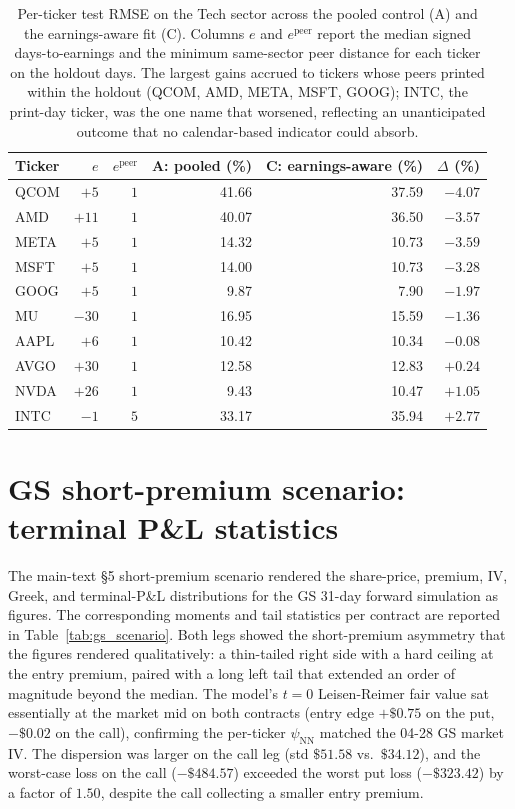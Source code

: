 \begin{table}[ht]
\centering
\caption{Per-ticker test RMSE on the Tech sector across the pooled control (A) and the earnings-aware fit (C). Columns $e$ and $e^{\text{peer}}$ report the median signed days-to-earnings and the minimum same-sector peer distance for each ticker on the holdout days. The largest gains accrued to tickers whose peers printed within the holdout (QCOM, AMD, META, MSFT, GOOG); INTC, the print-day ticker, was the one name that worsened, reflecting an unanticipated outcome that no calendar-based indicator could absorb.}\label{tab:tech_pivot}
\begin{tabular}{lrrrrr}
\toprule
Ticker & $e$ & $e^{\text{peer}}$ & A: pooled (\%) & C: earnings-aware (\%) & $\Delta$ (\%) \\
\midrule
QCOM & $+5$  & $1$ & 41.66 & 37.59 & $-4.07$ \\
AMD  & $+11$ & $1$ & 40.07 & 36.50 & $-3.57$ \\
META & $+5$  & $1$ & 14.32 & 10.73 & $-3.59$ \\
MSFT & $+5$  & $1$ & 14.00 & 10.73 & $-3.28$ \\
GOOG & $+5$  & $1$ &  9.87 &  7.90 & $-1.97$ \\
MU   & $-30$ & $1$ & 16.95 & 15.59 & $-1.36$ \\
AAPL & $+6$  & $1$ & 10.42 & 10.34 & $-0.08$ \\
AVGO & $+30$ & $1$ & 12.58 & 12.83 & $+0.24$ \\
NVDA & $+26$ & $1$ &  9.43 & 10.47 & $+1.05$ \\
INTC & $-1$  & $5$ & 33.17 & 35.94 & $+2.77$ \\
\bottomrule
\end{tabular}
\end{table}

\section{GS short-premium scenario: terminal P\&L statistics}\label{sec:supp_gs_pnl}

The main-text §5 short-premium scenario rendered the share-price, premium, IV, Greek, and terminal-P\&L distributions for the GS 31-day forward simulation as figures. The corresponding moments and tail statistics per contract are reported in Table~\ref{tab:gs_scenario}. Both legs showed the short-premium asymmetry that the figures rendered qualitatively: a thin-tailed right side with a hard ceiling at the entry premium, paired with a long left tail that extended an order of magnitude beyond the median. The model's $t=0$ Leisen-Reimer fair value sat essentially at the market mid on both contracts (entry edge $+\$0.75$ on the put, $-\$0.02$ on the call), confirming the per-ticker $\psi_{\mathrm{NN}}$ matched the 04-28 GS market IV. The dispersion was larger on the call leg (std $\$51.58$ vs.\ $\$34.12$), and the worst-case loss on the call ($-\$484.57$) exceeded the worst put loss ($-\$323.42$) by a factor of $1.50$, despite the call collecting a smaller entry premium.


